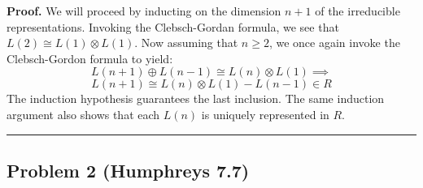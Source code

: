 \documentclass[12pt]{article}%
\newenvironment{proof}[1][Proof]{\textbf{#1.} }{\ \rule{0.5em}{0.5em}}
\begin{document}
\begin{enumerate}
\begin{proof}
    We will proceed by inducting on the dimension $n+1$ of the irreducible representations. Invoking the Clebsch-Gordan formula, we see that $L(2) \cong L(1) \otimes L(1)$. Now assuming that $n \geq 2$, we once again invoke the Clebsch-Gordon formula to yield:
    $$L(n+1) \oplus L(n-1) \cong L(n) \otimes L(1) \implies $$ $$ L(n+1) \cong L(n) \otimes L(1) - L(n-1) \in R$$ The induction hypothesis guarantees the last inclusion. The same induction argument also shows that each $L(n)$ is uniquely represented in $R$.
  \end{proof}
\end{enumerate}

\subsection*{Problem 2 (Humphreys 7.7)}
\end{document}
